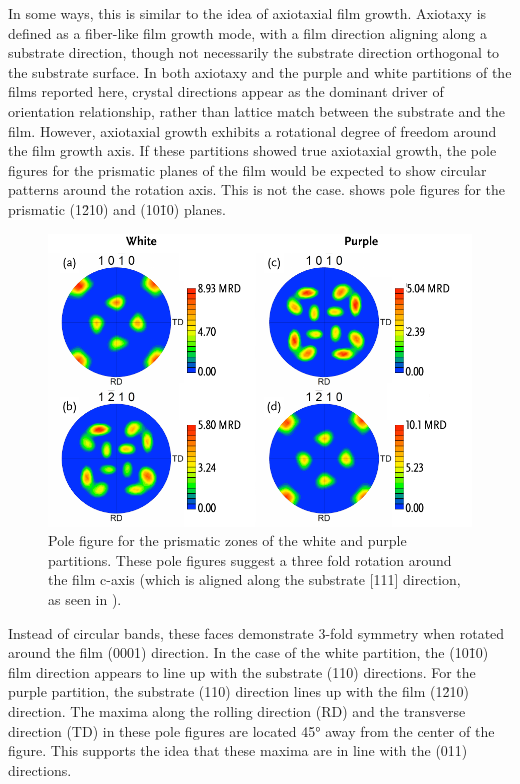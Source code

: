 In some ways, this is similar to the idea of axiotaxial film growth. Axiotaxy is defined
as a fiber-like film growth mode, with a film direction aligning along a substrate
direction, though not necessarily the substrate direction orthogonal to the substrate
surface. In both axiotaxy and the purple and white partitions of the films reported here,
crystal directions appear as the dominant driver of orientation relationship, rather than
lattice match between the substrate and the film. However, axiotaxial growth exhibits a
rotational degree of freedom around the film growth axis.  If these partitions showed true
axiotaxial growth, the pole figures for the prismatic planes of the film would be expected
to show circular patterns around the rotation axis. This is not the case.
 shows pole figures for the prismatic (1\={2}10) and
(10\={1}0) planes.
\begin{figure}
	\includegraphics[width=\textwidth]{purplewhiteprismatic.pdf}
	\caption[Prismatic pole figures for white and purple grains]{%
		Pole figure for the prismatic zones of the white and purple partitions. 
		These pole figures suggest a three fold rotation around the film c-axis 
		(which is aligned along the substrate [111] direction, as seen in 
		).}
	\label{fig:purplewhiteprismatic}
\end{figure}
Instead of circular bands, these faces demonstrate 3-fold symmetry when rotated around the
film (0001) direction. In the case of the white partition, the (10\={1}0) film direction
appears to line up with the substrate (110) directions. For the purple partition, the
substrate (110) direction lines up with the film (1\={2}10) direction. The maxima along
the rolling direction (RD) and the transverse direction (TD) in these pole figures are
located 45\si{\degree} away from the center of the figure. This supports the idea that
these maxima are in line with the (011) directions. 

